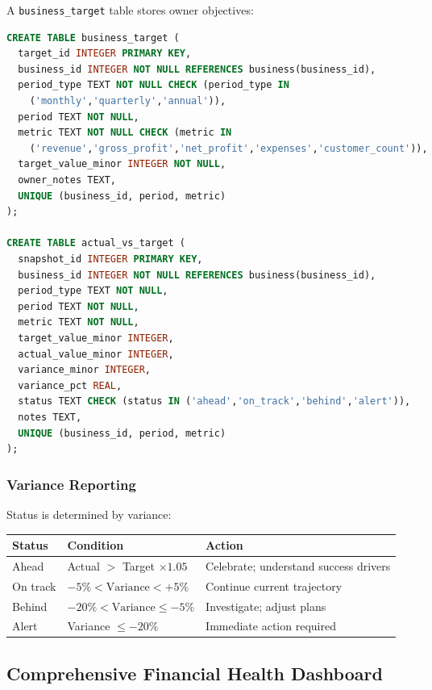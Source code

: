 \documentclass[10pt,a4paper]{article}
\newcommand{\code}[1]{\texttt{\small #1}}
\begin{document}
A \code{business\_target} table stores owner objectives:

\begin{lstlisting}[language=SQL,caption={Target and variance tracking}]
CREATE TABLE business_target (
  target_id INTEGER PRIMARY KEY,
  business_id INTEGER NOT NULL REFERENCES business(business_id),
  period_type TEXT NOT NULL CHECK (period_type IN 
    ('monthly','quarterly','annual')),
  period TEXT NOT NULL,
  metric TEXT NOT NULL CHECK (metric IN 
    ('revenue','gross_profit','net_profit','expenses','customer_count')),
  target_value_minor INTEGER NOT NULL,
  owner_notes TEXT,
  UNIQUE (business_id, period, metric)
);

CREATE TABLE actual_vs_target (
  snapshot_id INTEGER PRIMARY KEY,
  business_id INTEGER NOT NULL REFERENCES business(business_id),
  period_type TEXT NOT NULL,
  period TEXT NOT NULL,
  metric TEXT NOT NULL,
  target_value_minor INTEGER,
  actual_value_minor INTEGER,
  variance_minor INTEGER,
  variance_pct REAL,
  status TEXT CHECK (status IN ('ahead','on_track','behind','alert')),
  notes TEXT,
  UNIQUE (business_id, period, metric)
);
\end{lstlisting}

\subsubsection{Variance Reporting}

Status is determined by variance:

\begin{center}
\begin{tabularx}{\textwidth}{@{}p{2.0cm}p{3.6cm}Y@{}}
\toprule
\textbf{Status} & \textbf{Condition} & \textbf{Action}\\
\midrule
Ahead & Actual $>$ Target $\times 1.05$ & Celebrate; understand success drivers\\
On track & $-5\% < \text{Variance} < +5\%$ & Continue current trajectory\\
Behind & $-20\% < \text{Variance} \le -5\%$ & Investigate; adjust plans\\
Alert & Variance $\le -20\%$ & Immediate action required\\
\bottomrule
\end{tabularx}
\end{center}

\subsection{Comprehensive Financial Health Dashboard}
\end{document}
